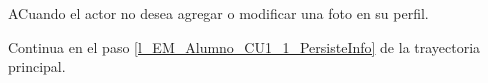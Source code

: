 \begin{UCtrayectoriaA}{A}{Cuando el actor no desea agregar o modificar
una foto en su perfil.}

	\UCpaso Continua en el paso \ref{l_EM_Alumno_CU1_1_PersisteInfo} de la trayectoria principal.

\end{UCtrayectoriaA}


